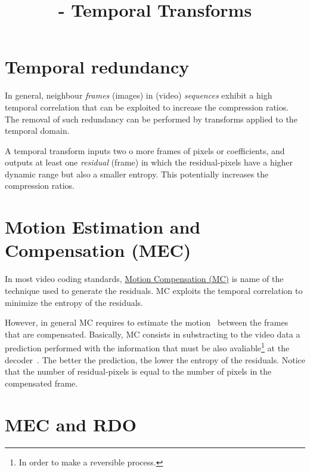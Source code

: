 

\title{\SM{} - Temporal Transforms}

\maketitle
\tableofcontents

\section{Temporal redundancy}

In general, neighbour \emph{frames} (images) in (video)
\emph{sequences} exhibit a high temporal correlation that can be
exploited to increase the compression ratios. The removal of such
redundancy can be performed by transforms applied to the temporal
domain.

A temporal transform inputs two o more frames of pixels or
coefficients, and outputs at least one \emph{residual} (frame) in
which the residual-pixels have a higher dynamic range but also a
smaller entropy. This potentially increases the compression ratios.


\section{Motion Estimation and Compensation (MEC)}

In most video coding standards,
\href{https://en.wikipedia.org/wiki/Motion_compensation}{Motion
  Compensation (MC)} is name of the technique used to generate the
residuals. MC exploits the temporal correlation to minimize the
entropy of the residuals.

However, in general MC requires to estimate the
motion~\cite{vruiz__ME} between the frames that are
compensated. Basically, MC consists in substracting to the video data
a prediction performed with the information that must be also
avaliable\footnote{In order to make a reversible process.} at the
decoder~\cite{vruiz__MCT}. The better the prediction, the lower the
entropy of the residuals. Notice that the number of residual-pixels is
equal to the number of pixels in the compensated frame.


\section{MEC and RDO}

